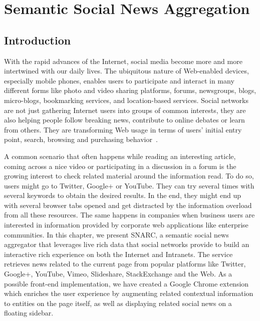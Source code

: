 \chapter{Semantic Social News Aggregation}\label{chapter:snarc}
\graphicspath{{Part2/Chapter2/figures/}}

\section{Introduction}
With the rapid advances of the Internet, social media become more and more intertwined with our daily lives. The ubiquitous nature of Web-enabled devices, especially mobile phones, enables users to participate and interact in many different forms like photo and video sharing platforms, forums, newsgroups, blogs, micro-blogs, bookmarking services, and location-based services. Social networks are not just gathering Internet users into groups of common interests, they are also helping people follow breaking news, contribute to online debates or learn from others. They are transforming Web usage in terms of users' initial entry point, search, browsing and purchasing behavior~\cite{Bakshy:WWW:12}.

A common scenario that often happens while reading an interesting article, coming across a nice video or participating in a discussion in a forum is the growing interest to check related material around the information read. To do so, users might go to Twitter, Google+ or YouTube. They can try several times with several keywords to obtain the desired results. In the end, they might end up with several browser tabs opened and get distracted by the information overload from all these resources. The same happens in companies when business users are interested in information provided by corporate web applications like enterprise communities. In this chapter, we present SNARC, a semantic social news aggregator that leverages live rich data that social networks provide to build an interactive rich experience on both the Internet and Intranets. The service retrieves news related to the current page from popular platforms like Twitter, Google+, YouTube, Vimeo, Slideshare, StackExchange and the Web. As a possible front-end implementation, we have created a Google Chrome extension which enriches the user experience by augmenting related contextual information to entities on the page itself, as well as displaying related social news on a floating sidebar.


